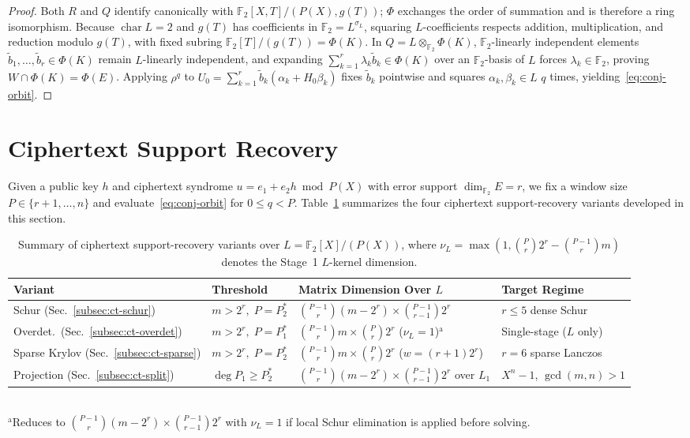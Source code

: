 \documentclass[11pt,a4paper]{article}
\theoremstyle{definition}
\theoremstyle{remark}
\newcommand{\Ftwo}{\mathbb{F}_2}
\begin{document}
\begin{proof}
Both $R$ and $Q$ identify canonically with $\Ftwo[X, T]/(P(X), g(T))$; $\Phi$ exchanges the order of summation and is therefore a ring isomorphism. Because $\operatorname{char} L = 2$ and $g(T)$ has coefficients in $\Ftwo = L^{\sigma_L}$, squaring $L$-coefficients respects addition, multiplication, and reduction modulo $g(T)$, with fixed subring $\Ftwo[T]/(g(T)) = \Phi(K)$. In $Q = L \otimes_{\Ftwo} \Phi(K)$, $\Ftwo$-linearly independent elements $\tilde{b}_1, \dots, \tilde{b}_r \in \Phi(K)$ remain $L$-linearly independent, and expanding $\sum_{k=1}^r \lambda_k \tilde{b}_k \in \Phi(K)$ over an $\Ftwo$-basis of $L$ forces $\lambda_k \in \Ftwo$, proving $W \cap \Phi(K) = \Phi(E)$. Applying $\rho^q$ to $U_0 = \sum_{k=1}^r \tilde{b}_k(\alpha_k + H_0 \beta_k)$ fixes $\tilde{b}_k$ pointwise and squares $\alpha_k, \beta_k \in L$ $q$ times, yielding~\eqref{eq:conj-orbit}.
\end{proof}

\section{Ciphertext Support Recovery}
\label{sec:ct-attacks}

Given a public key $h$ and ciphertext syndrome $u = e_1 + e_2 h \bmod P(X)$ with error support $\dim_{\Ftwo} E = r$, we fix a window size $P \in \{r+1, \dots, n\}$ and evaluate~\eqref{eq:conj-orbit} for $0 \le q < P$. Table~\ref{tab:ct-variants} summarizes the four ciphertext support-recovery variants developed in this section.

\begin{table}[t]
\centering
\small
\caption{Summary of ciphertext support-recovery variants over $L = \Ftwo[X]/(P(X))$, where $\nu_L = \max(1, \binom{P}{r}2^r - \binom{P-1}{r}m)$ denotes the Stage~1 $L$-kernel dimension.}
\label{tab:ct-variants}
\setlength{\tabcolsep}{3.5pt}
\begin{tabular}{@{}llll@{}}
\toprule
\textbf{Variant} & \textbf{Threshold} & \textbf{Matrix Dimension Over $L$} & \textbf{Target Regime} \\
\midrule
Schur (Sec.~\ref{subsec:ct-schur}) & $m > 2^r,\; P = P_2^*$ & $\binom{P-1}{r}(m - 2^r) \times \binom{P-1}{r-1}2^r$ & $r \le 5$ dense Schur \\
Overdet.\ (Sec.~\ref{subsec:ct-overdet}) & $m > 2^r,\; P = P_1^*$ & $\binom{P-1}{r}m \times \binom{P}{r}2^r$ ($\nu_L = 1$)$^{\mathrm{a}}$ & Single-stage ($L$ only) \\
Sparse Krylov (Sec.~\ref{subsec:ct-sparse}) & $m > 2^r,\; P = P_2^*$ & $\binom{P-1}{r}m \times \binom{P}{r}2^r$ ($w = (r{+}1)2^r$) & $r = 6$ sparse Lanczos \\
Projection (Sec.~\ref{subsec:ct-split}) & $\deg P_1 \ge P_2^*$ & $\binom{P-1}{r}(m - 2^r) \times \binom{P-1}{r-1}2^r$ over $L_1$ & $X^n - 1$, $\gcd(m,n) > 1$ \\
\bottomrule
\end{tabular}
\\[0.3em]
{\scriptsize $^{\mathrm{a}}$Reduces to $\binom{P-1}{r}(m - 2^r) \times \binom{P-1}{r-1}2^r$ with $\nu_L = 1$ if local Schur elimination is applied before solving.}
\end{table}
\end{document}
